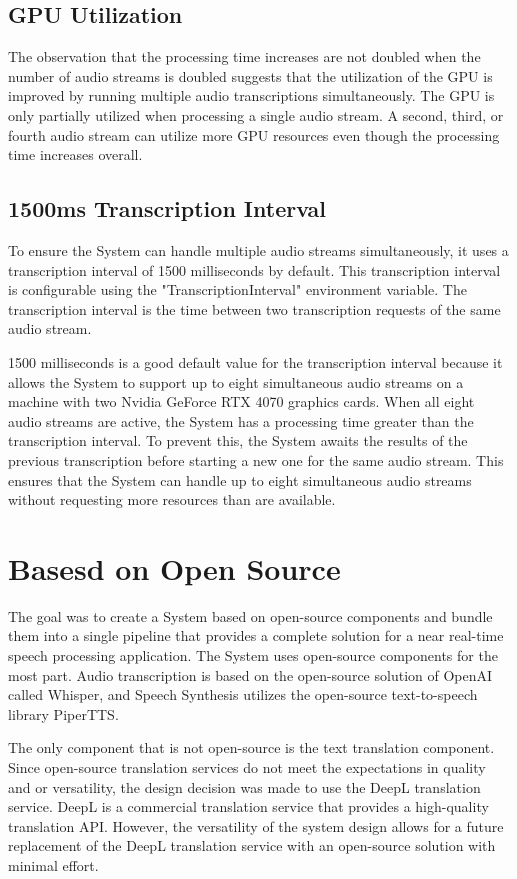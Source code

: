 \subsection{GPU Utilization}

The observation that the processing time increases are not doubled when the number of audio streams is doubled suggests 
that the utilization of the GPU is improved by running multiple audio transcriptions simultaneously. The GPU is only 
partially utilized when processing a single audio stream. A second, third, or fourth audio stream can utilize more GPU 
resources even though the processing time increases overall.

\subsection{1500ms Transcription Interval}

To ensure the System can handle multiple audio streams simultaneously, it uses a transcription interval of 1500 
milliseconds by default. This transcription interval is configurable using the "TranscriptionInterval" environment 
variable. The transcription interval is the time between two transcription requests of the same audio stream.

1500 milliseconds is a good default value for the transcription interval because it allows the System to support up to 
eight simultaneous audio streams on a machine with two Nvidia GeForce RTX 4070 graphics cards. When all eight audio 
streams are active, the System has a processing time greater than the transcription interval. To prevent this, 
the System awaits the results of the previous transcription before starting a new one for the same audio stream. This 
ensures that the System can handle up to eight simultaneous audio streams without requesting more resources than are 
available.


\section{Basesd on Open Source}

The goal was to create a System based on open-source components and bundle them into a single pipeline that provides a 
complete solution for a near real-time speech processing application. The System uses open-source components for the 
most part. Audio transcription is based on the open-source solution of OpenAI called Whisper, and Speech Synthesis 
utilizes the open-source text-to-speech library PiperTTS.

The only component that is not open-source is the text translation component. Since open-source translation 
services do not meet the expectations in quality and or versatility, the design decision was made to use the DeepL 
translation service. DeepL is a commercial translation service that provides a high-quality translation API. However, 
the versatility of the system design allows for a future replacement of the DeepL translation service with an 
open-source solution with minimal effort.
